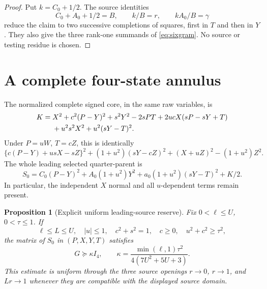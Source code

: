 \documentclass[11pt]{article}
\newtheorem{proposition}[lemma]{Proposition}
\begin{document}
\begin{proof}
Put $k=C_0+1/2$.  The source identities
\[
 C_0+A_0+1/2=B,\qquad k/B=r,\qquad kA_0/B=\gamma
\]
reduce the claim to two successive completions of squares, first in
$T$ and then in $Y$.  They also give the three rank-one summands of
\eqref{eq:sixgram}.  No source or testing residue is chosen.
\end{proof}

\section*{A complete four-state annulus}

The normalized complete signed core, in the same raw variables, is
\begin{align}
 K={}&X^2+c^2(P-Y)^2+s^2Y^2-2sPT
       +2ucX(sP-sY+T)\notag\\
    &+u^2s^2X^2+u^2(sY-T)^2.                    \label{eq:core}
\end{align}
Under $P=uW$, $T=cZ$, this is identically
\[
 \{c(P-Y)+usX-sZ\}^2
 +(1+u^2)(sY-cZ)^2+(X+uZ)^2-(1+u^2)Z^2.
\]
The whole leading selected quarter-parent is
\[
 S_0=C_0(P-Y)^2+A_0(1+u^2)Y^2
           +a_0(1+u^2)(sY-T)^2+K/2.              \label{eq:parent}
\]
In particular, the independent $X$ normal and all $u$-dependent terms
remain present.

\begin{proposition}[Explicit uniform leading-source reserve]
Fix $0<\ell\leq U$, $0<\tau\leq1$.  If
\[
 \ell\leq L\leq U,\quad |u|\leq1,\quad
 c^2+s^2=1,\quad c\geq0,\quad u^2+c^2\geq\tau^2,
\]
the matrix of $S_0$ in $(P,X,Y,T)$ satisfies
\[
 G\succeq \kappa I_4,\qquad
 \kappa=\frac{\min(\ell,1)\tau^2}
                   {4(7U^2+5U+3)}.               \label{eq:kappa}
\]
This estimate is uniform through the three source openings
$r\to0$, $r\to1$, and $Lr\to1$ whenever they are compatible with
the displayed source domain.
\end{proposition}
\end{document}
